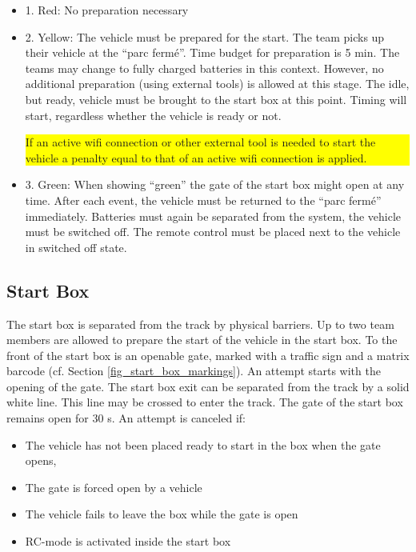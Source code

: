 \documentclass[a4paper]{report}
\newlength\colorboxwidth
\begin{document}
\begin{itemize}
	\item 1. Red: No preparation necessary

	\item 2. Yellow: The vehicle must be prepared for the start. The team picks up their vehicle at the “parc fermé”. Time budget for preparation is 5 min. The teams may change to fully charged batteries in this context. However, no additional preparation (using external tools) is allowed at this stage. The idle, but ready, vehicle must be brought to the start box at this point. Timing will start, regardless whether the vehicle is ready or not.\\
	      \colorbox{yellow}{\parbox{0.8\colorboxwidth}{
			      If an active wifi connection or other external tool is needed to start the vehicle a penalty equal to that of an active wifi connection is applied.}}

	\item 3. Green: When showing “green” the gate of the start box might open at any time. After each event, the vehicle must be returned to the “parc fermé” immediately. Batteries must again be separated from the system, the vehicle must be switched off. The remote control must be placed next to the vehicle in switched off state.
\end{itemize}

\subsection{Start Box}
\label{start_box}

The start box is separated from the track by physical barriers. Up to two team
members are allowed to prepare the start of the vehicle in the start box. To
the front of the start box is an openable gate, marked with a traffic sign and
a matrix barcode (cf. Section \ref{fig_start_box_markings}). An attempt starts
with the opening of the gate. The start box exit can be separated from the
track by a solid white line. This line may be crossed to enter the track. The
gate of the start box remains open for 30 s. An attempt is canceled if:

\begin{itemize}
	\item The vehicle has not been placed ready to start in the box when the gate opens,
	\item The gate is forced open by a vehicle

	\item The vehicle fails to leave the box while the gate is open

	\item RC-mode is activated inside the start box
\end{itemize}
\end{document}

